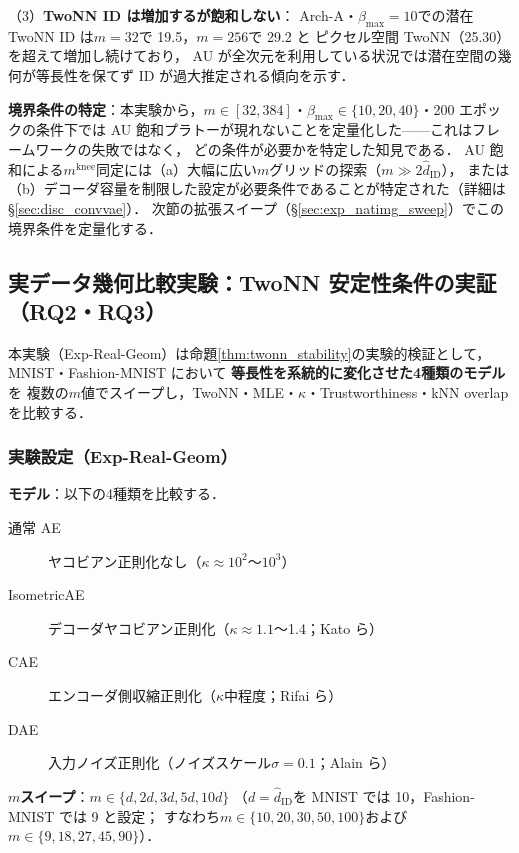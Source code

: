 \documentclass[11pt,a4paper]{jsarticle}
\newcommand{\kap}{\kappa}
\newcommand{\mknee}{m^{\mathrm{knee}}}
\begin{document}
（3）\textbf{TwoNN ID は増加するが飽和しない}：
Arch-A・$\beta_{\max}=10$での潜在 TwoNN ID は$m=32$で 19.5，$m=256$で 29.2 と
ピクセル空間 TwoNN（25.30）を超えて増加し続けており，
AU が全次元を利用している状況では潜在空間の幾何が等長性を保てず ID が過大推定される傾向を示す．

\textbf{境界条件の特定}：本実験から，$m \in [32, 384]$・$\beta_{\max} \in \{10, 20, 40\}$・200 エポックの条件下では
AU 飽和プラトーが現れないことを定量化した——これはフレームワークの失敗ではなく，
どの条件が必要かを特定した知見である．
AU 飽和による$\mknee$同定には（a）大幅に広い$m$グリッドの探索（$m \gg 2\hat{d}_\mathrm{ID}$），
または（b）デコーダ容量を制限した設定が必要条件であることが特定された（詳細は§\ref{sec:disc_convvae}）．
次節の拡張スイープ（§\ref{sec:exp_natimg_sweep}）でこの境界条件を定量化する．

\subsection{実データ幾何比較実験：TwoNN 安定性条件の実証（RQ2・RQ3）}\label{sec:exp_real_geom}

本実験（Exp-Real-Geom）は命題\ref{thm:twonn_stability}の実験的検証として，
MNIST・Fashion-MNIST において \textbf{等長性を系統的に変化させた4種類のモデル}を
複数の$m$値でスイープし，TwoNN・MLE・$\kap$・Trustworthiness・kNN overlap を比較する．

\subsubsection*{実験設定（Exp-Real-Geom）}

\textbf{モデル}：以下の4種類を比較する．
\begin{description}
  \item[通常 AE] ヤコビアン正則化なし（$\kap \approx 10^2$〜$10^3$）
  \item[IsometricAE] デコーダヤコビアン正則化（$\kap \approx 1.1$〜1.4；Kato ら\cite{kato2020rdae}）
  \item[CAE] エンコーダ側収縮正則化（$\kap$中程度；Rifai ら\cite{rifai2011cae}）
  \item[DAE] 入力ノイズ正則化（ノイズスケール$\sigma=0.1$；Alain ら\cite{alain2014dae}）
\end{description}

\textbf{$m$スイープ}：$m \in \{d, 2d, 3d, 5d, 10d\}$
（$d = \hat{d}_\mathrm{ID}$を MNIST では 10，Fashion-MNIST では 9 と設定；
すなわち$m \in \{10, 20, 30, 50, 100\}$および$m \in \{9, 18, 27, 45, 90\}$）．
\end{document}
